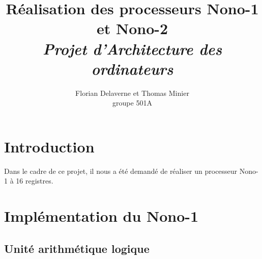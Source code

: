 \documentclass[10pt,a4paper]{article}
\title{Réalisation des processeurs Nono-1 et Nono-2 \\ \textit{Projet d'Architecture des ordinateurs}}
\author{Florian Delaverne et Thomas Minier \\ groupe 501A}
\begin{document}
\maketitle
\vspace{3cm}
\tableofcontents
\newpage

\section{Introduction}

Dans le cadre de ce projet, il nous a été demandé de réaliser un processeur Nono-1 à 16 registres.

\section{Implémentation du Nono-1}

\subsection{Unité arithmétique logique}
\end{document}
